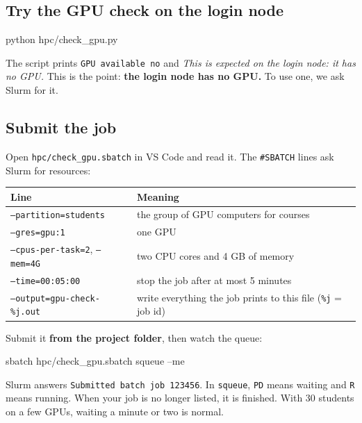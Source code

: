 \documentclass[11pt,a4paper]{article}
\begin{document}
\subsection{Try the GPU check on the login node}
\begin{cmd}
python hpc/check_gpu.py
\end{cmd}
The script prints \texttt{GPU available no} and \emph{This is expected on the login node: it has no GPU.} This is the point: \textbf{the login node has no GPU.} To use one, we ask Slurm for it.

\subsection{Submit the job}
Open \texttt{hpc/check\_gpu.sbatch} in VS Code and read it. The \texttt{\#SBATCH} lines ask Slurm for resources:

\begin{tabularx}{\linewidth}{@{}l X@{}}
\toprule
\textbf{Line} & \textbf{Meaning} \\
\midrule
\texttt{--partition=students} & the group of GPU computers for courses \\
\texttt{--gres=gpu:1} & one GPU \\
\texttt{--cpus-per-task=2}, \texttt{--mem=4G} & two CPU cores and 4 GB of memory \\
\texttt{--time=00:05:00} & stop the job after at most 5 minutes \\
\texttt{--output=gpu-check-\%j.out} & write everything the job prints to this file (\texttt{\%j} = job id) \\
\bottomrule
\end{tabularx}

Submit it \textbf{from the project folder}, then watch the queue:
\begin{cmd}
sbatch hpc/check_gpu.sbatch
squeue --me
\end{cmd}
Slurm answers \texttt{Submitted batch job 123456}. In \texttt{squeue}, \texttt{PD} means waiting and \texttt{R} means running. When your job is no longer listed, it is finished. With 30 students on a few GPUs, waiting a minute or two is normal.
\end{document}
